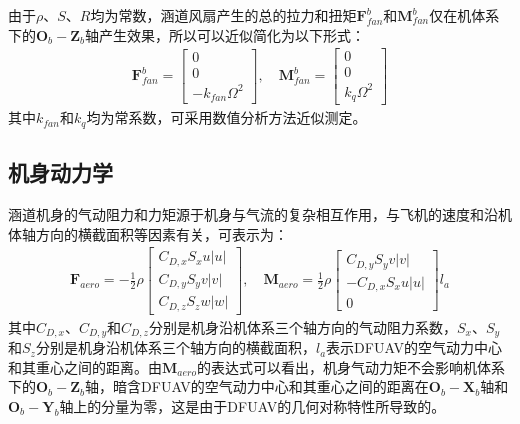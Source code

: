 由于$\rho$、$S$、$R$均为常数，涵道风扇产生的总的拉力和扭矩$\boldsymbol{F}_{fan}^b$和$\boldsymbol{M}_{fan}^b$仅在机体系下的${\boldsymbol{O}_b}-{\boldsymbol{Z}_b}$轴产生效果，所以可以近似简化为以下形式\cite{choiStaticAnalysisSmall2012}：
\begin{equation}
    \begin{aligned}
            \boldsymbol{F}_{fan}^b=\begin{bmatrix}0 \\ 0 \\
                -k_{fan}\Omega^2
            \end{bmatrix},\quad
            \boldsymbol{M}_{fan}^b=\begin{bmatrix}0 \\ 0 \\
            k_{q}\Omega^2
            \end{bmatrix}
    \end{aligned}
    \label{eq_22}
\end{equation}
其中$k_{fan}$和$k_{q}$均为常系数，可采用数值分析方法近似测定。

\subsection{机身动力学}

涵道机身的气动阻力和力矩源于机身与气流的复杂相互作用，与飞机的速度和沿机体轴方向的横截面积等因素有关，可表示为\cite{johnsonModelingControlFlight2006b,choiStaticAnalysisSmall2012}：
\begin{equation}
    \begin{gathered}
    \boldsymbol{F}_{aero}=-\frac{1}{2}\rho
    \begin{bmatrix}
    C_{D,x}S_xu|u| \\
    C_{D,y}S_yv|v| \\
    C_{D,z}S_zw|w|
    \end{bmatrix},\quad
    \boldsymbol{M}_{aero}=\frac{1}{2}\rho
    \begin{bmatrix}
    C_{D,y}S_yv|v| \\
    -C_{D,x}S_xu|u| \\
    0
    \end{bmatrix}l_{a}
    \label{eq_23}
    \end{gathered}
\end{equation}
其中$C_{D,x}$、$C_{D,y}$和$C_{D,z}$分别是机身沿机体系三个轴方向的气动阻力系数，$S_x$、$S_y$和$S_z$分别是机身沿机体系三个轴方向的横截面积，$l_{a}$表示DFUAV的空气动力中心和其重心之间的距离。由$\boldsymbol{M}_{aero}$的表达式可以看出，机身气动力矩不会影响机体系下的${\boldsymbol{O}_b}-{\boldsymbol{Z}_b}$轴，暗含DFUAV的空气动力中心和其重心之间的距离在${\boldsymbol{O}_b}-{\boldsymbol{X}_b}$轴和${\boldsymbol{O}_b}-{\boldsymbol{Y}_b}$轴上的分量为零，这是由于DFUAV的几何对称特性所导致的。

